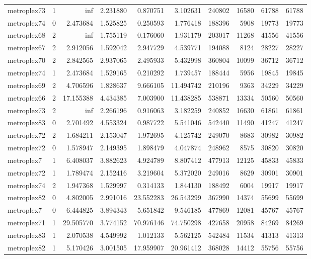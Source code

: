 \begin{longtable}{|l|r|r|r|r|r|r|r|r|r|}
metroplex73 & 1 & inf & 2.231880 & 0.870751 & 3.102631 & 240802 & 16580 & 61788 & 61788 \\
metroplex74 & 0 & 2.473684 & 1.525825 & 0.250593 & 1.776418 & 188396 & 5908 & 19773 & 19773 \\
metroplex68 & 2 & inf & 1.755119 & 0.176060 & 1.931179 & 203017 & 11268 & 41556 & 41556 \\
metroplex67 & 2 & 2.912056 & 1.592042 & 2.947729 & 4.539771 & 194088 & 8124 & 28227 & 28227 \\
metroplex70 & 2 & 2.842565 & 2.937065 & 2.495933 & 5.432998 & 360804 & 10099 & 36712 & 36712 \\
metroplex74 & 1 & 2.473684 & 1.529165 & 0.210292 & 1.739457 & 188444 & 5956 & 19845 & 19845 \\
metroplex69 & 2 & 4.706596 & 1.828637 & 9.666105 & 11.494742 & 210196 & 9363 & 34229 & 34229 \\
metroplex66 & 2 & 17.155388 & 4.434385 & 7.003900 & 11.438285 & 538871 & 13334 & 50560 & 50560 \\
metroplex73 & 2 & inf & 2.266196 & 0.916063 & 3.182259 & 240852 & 16630 & 61861 & 61861 \\
metroplex83 & 0 & 2.701492 & 4.553324 & 0.987722 & 5.541046 & 542440 & 11490 & 41247 & 41247 \\
metroplex72 & 2 & 1.684211 & 2.153047 & 1.972695 & 4.125742 & 249070 & 8683 & 30982 & 30982 \\
metroplex72 & 0 & 1.578947 & 2.149395 & 1.898479 & 4.047874 & 248962 & 8575 & 30820 & 30820 \\
metroplex7 & 1 & 6.408037 & 3.882623 & 4.924789 & 8.807412 & 477913 & 12125 & 45833 & 45833 \\
metroplex72 & 1 & 1.789474 & 2.152416 & 3.219604 & 5.372020 & 249016 & 8629 & 30901 & 30901 \\
metroplex74 & 2 & 1.947368 & 1.529997 & 0.314133 & 1.844130 & 188492 & 6004 & 19917 & 19917 \\
metroplex82 & 0 & 4.802005 & 2.991016 & 23.552283 & 26.543299 & 367990 & 14374 & 55699 & 55699 \\
metroplex7 & 0 & 6.444825 & 3.894343 & 5.651842 & 9.546185 & 477869 & 12081 & 45767 & 45767 \\
metroplex71 & 1 & 29.505770 & 3.774152 & 70.976146 & 74.750298 & 427658 & 20958 & 84269 & 84269 \\
metroplex83 & 1 & 2.070538 & 4.549992 & 1.012133 & 5.562125 & 542484 & 11534 & 41313 & 41313 \\
metroplex82 & 1 & 5.170426 & 3.001505 & 17.959907 & 20.961412 & 368028 & 14412 & 55756 & 55756 \\

\end{longtable}
